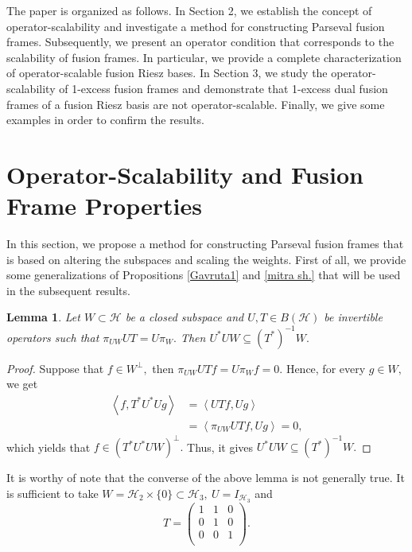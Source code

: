 \documentclass[sn-mathphys-num]{sn-jnl}%
\newtheorem{lemma}[theorem]{Lemma}
\theoremstyle{definition}
\theoremstyle{remark}
\numberwithin{equation}{section}
\begin{document}
The paper is organized as follows. In Section 2, we establish the concept of operator-scalability and investigate a method for constructing Parseval fusion frames. Subsequently, we present an operator condition that corresponds to the scalability of fusion frames. In particular, we provide a complete characterization of operator-scalable fusion Riesz bases. In Section 3, we study the operator-scalability of 1-excess fusion frames and demonstrate that 1-excess dual fusion frames of a fusion Riesz basis are not operator-scalable. Finally, we give some examples in order to confirm the results. 

\section{Operator-Scalability and Fusion Frame Properties}
In this section, we propose a method for constructing Parseval fusion frames that is based on altering the subspaces and scaling the weights. First of all, we provide some generalizations of Propositions \ref{Gavruta1} and \ref{mitra sh.} that will be used in the subsequent results.

\begin{lemma}\label{extend Gav}
Let $ W\subset \mathcal{H}$ be a closed subspace and $U,T \in B(\mathcal{H})$ be invertible operators such that $\pi_{UW}UT=U\pi_{W}.$ Then $U^{*}UW\subseteq \left( T^{*}\right) ^{-1}W.$
\end{lemma}

\begin{proof}
Suppose that $f \in W^\perp,$ then $\pi_{UW}UTf=U\pi_{W}f=0.$ Hence, for every $g \in W,$ we get
\begin{align*}
\left\langle f,T^{*}U^{*}Ug \right\rangle &= \left\langle UTf,Ug \right\rangle 
\\&=\left\langle \pi_{UW}UTf,Ug \right\rangle =0,
\end{align*}
which yields that $f \in \left( T^{*}U^{*}UW\right) ^\perp.$ Thus, it gives $U^{*}UW\subseteq \left( T^{*}\right) ^{-1}W.$
\end{proof}

It is worthy of note that the converse of the above lemma is not generally true. It is sufficient to take $ W=\mathcal{H}_{2}\times \{0\} \subset \mathcal{H}_{3},~U=I_{\mathcal{H}_{3}}$ and
\begin{equation*}
T=\begin{pmatrix}
1 & 1 & 0 \\
0 & 1 & 0 \\
0 & 0 & 1 \\
\end{pmatrix}.
\end{equation*}
\end{document}

